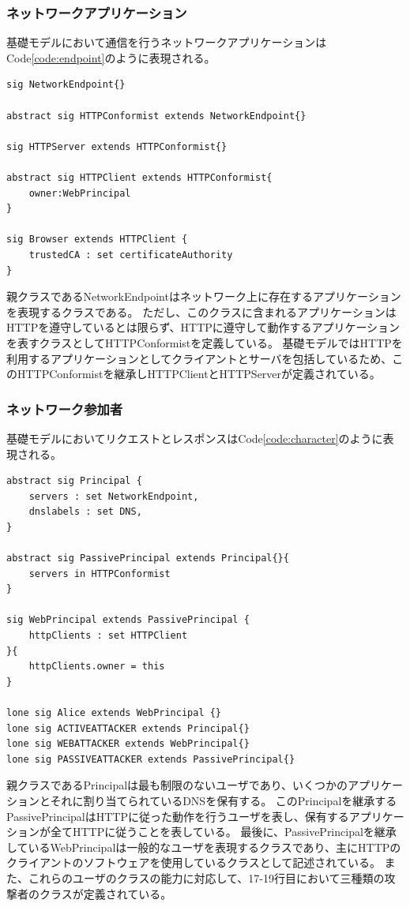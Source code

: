 \documentclass[12pt,a4paper]{jbook}
\begin{document}
\subsubsection{ネットワークアプリケーション}
基礎モデルにおいて通信を行うネットワークアプリケーションはCode\ref{code:endpoint}のように表現される。
\begin{lstlisting}[caption=ネットワーク参加者, label=code:endpoint]
sig NetworkEndpoint{}

abstract sig HTTPConformist extends NetworkEndpoint{}

sig HTTPServer extends HTTPConformist{}

abstract sig HTTPClient extends HTTPConformist{
	owner:WebPrincipal
}

sig Browser extends HTTPClient {
	trustedCA : set certificateAuthority
}
\end{lstlisting}
親クラスであるNetworkEndpointはネットワーク上に存在するアプリケーションを表現するクラスである。
ただし、このクラスに含まれるアプリケーションはHTTPを遵守しているとは限らず、HTTPに遵守して動作するアプリケーションを表すクラスとしてHTTPConformistを定義している。
基礎モデルではHTTPを利用するアプリケーションとしてクライアントとサーバを包括しているため、このHTTPConformistを継承しHTTPClientとHTTPServerが定義されている。

\subsubsection{ネットワーク参加者}
基礎モデルにおいてリクエストとレスポンスはCode\ref{code:character}のように表現される。
\begin{lstlisting}[caption=ネットワーク参加者, label=code:character]
abstract sig Principal {
	servers : set NetworkEndpoint,
	dnslabels : set DNS,
}

abstract sig PassivePrincipal extends Principal{}{
	servers in HTTPConformist
}

sig WebPrincipal extends PassivePrincipal {
	httpClients : set HTTPClient
}{
	httpClients.owner = this
}

lone sig Alice extends WebPrincipal {}
lone sig ACTIVEATTACKER extends Principal{}
lone sig WEBATTACKER extends WebPrincipal{}
lone sig PASSIVEATTACKER extends PassivePrincipal{}
\end{lstlisting}
親クラスであるPrincipalは最も制限のないユーザであり、いくつかのアプリケーションとそれに割り当てられているDNSを保有する。
このPrincipalを継承するPassivePrincipalはHTTPに従った動作を行うユーザを表し、保有するアプリケーションが全てHTTPに従うことを表している。
最後に、PassivePrincipalを継承しているWebPrincipalは一般的なユーザを表現するクラスであり、主にHTTPのクライアントのソフトウェアを使用しているクラスとして記述されている。
また、これらのユーザのクラスの能力に対応して、17-19行目において三種類の攻撃者のクラスが定義されている。
\end{document}
